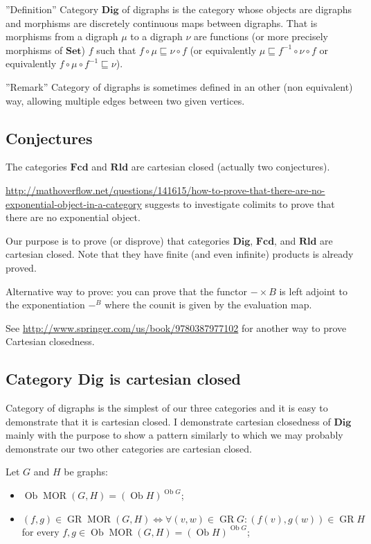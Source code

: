 ''Definition'' Category $\mathbf{Dig}$ of digraphs is the category whose objects are digraphs and morphisms are discretely continuous maps between digraphs. That is morphisms from a digraph $\mu$ to a digraph $\nu$ are functions (or more precisely morphisms of $\mathbf{Set}$) $f$ such that $f \circ \mu \sqsubseteq \nu \circ f$ (or equivalently $\mu \sqsubseteq f^{- 1} \circ \nu \circ f$ or equivalently $f \circ \mu \circ f^{- 1} \sqsubseteq \nu$).

''Remark'' Category of digraphs is sometimes defined in an other (non equivalent) way, allowing multiple edges between two given vertices.

\subsection{Conjectures}

\begin{conjecture}
  The categories $\mathbf{Fcd}$ and $\mathbf{Rld}$ are
  cartesian closed (actually two conjectures).
\end{conjecture}

\url{http://mathoverflow.net/questions/141615/how-to-prove-that-there-are-no-exponential-object-in-a-category}
suggests to investigate colimits to prove that there are no exponential
object.

Our purpose is to prove (or disprove) that categories $\mathbf{Dig}$, $\mathbf{Fcd}$, and $\mathbf{Rld}$ are cartesian closed. Note that they have finite (and even infinite) products is already proved.

Alternative way to prove:
you can prove that the functor $-\times B$ is left adjoint to the exponentiation $-^B$ where the counit is given by the evaluation map.

See \url{http://www.springer.com/us/book/9780387977102} for another way to prove Cartesian closedness.

\subsection{Category Dig is cartesian closed}

Category of digraphs is the simplest of our three categories and it is easy to demonstrate that it is cartesian closed. I demonstrate cartesian closedness of $\mathbf{Dig}$ mainly with the purpose to show a pattern similarly to which we may probably demonstrate our two other categories are cartesian closed.

Let $G$ and $H$ be graphs:
\begin{itemize}
\item $\operatorname{Ob} \operatorname{MOR} ( G , H) = ( \operatorname{Ob} H)^{\operatorname{Ob} G}$;
\item $( f , g) \in \operatorname{GR} \operatorname{MOR} ( G , H) \Leftrightarrow \forall ( v , w) \in \operatorname{GR} G : ( f ( v) , g ( w)) \in \operatorname{GR} H$ for every $f, g \in \operatorname{Ob} \operatorname{MOR} ( G , H) = ( \operatorname{Ob} H)^{\operatorname{Ob} G}$;
\end{itemize}

